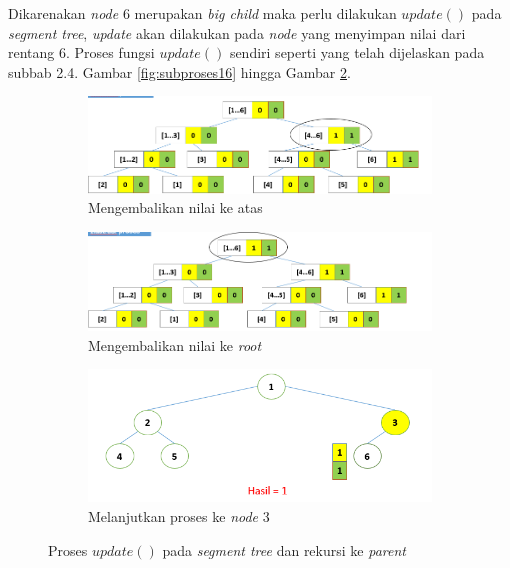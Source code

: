 \quad Dikarenakan \textit{node} 6 merupakan \textit{big child} maka perlu dilakukan \textit{$update()$} pada \textit{segment tree}, \textit{update} akan dilakukan pada \textit{node} yang menyimpan nilai dari rentang 6. Proses fungsi \textit{$update()$} sendiri seperti yang telah dijelaskan pada subbab 2.4. Gambar \ref{fig:subproses16} hingga Gambar \ref{fig:subproses20}.
\begin{figure}[H]
	\begin{subfigure}{1.0\textwidth}
		\centering
		\includegraphics[scale=0.33]{assets/images/Ilustrasi_proses_19.PNG}
		\caption{Mengembalikan nilai ke atas}
		\label{fig:subproses19}
	\end{subfigure}
	\begin{subfigure}{1.0\textwidth}
		\centering
		\includegraphics[scale=0.33]{assets/images/Ilustrasi_proses_20.PNG}
		\caption{Mengembalikan nilai ke \textit{root}}
		\label{fig:subproses20}
	\end{subfigure}
	\begin{subfigure}{1.0\textwidth}
		\centering
		\includegraphics[scale=0.33]{assets/images/Ilustrasi_proses_21.PNG}
		\caption{Melanjutkan proses ke \textit{node} 3}
		\label{fig:subproses21}
	\end{subfigure}
	\caption{Proses \textit{$update()$} pada \textit{segment tree} dan rekursi ke \textit{parent}}
	\label{fig:proses5}
\end{figure}

